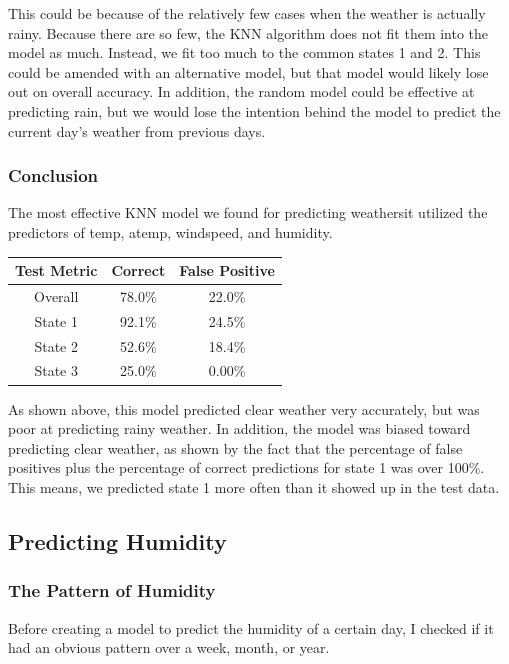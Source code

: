 \documentclass[12pt]{article}
\begin{document}
This could be because of the relatively few cases when the weather is actually rainy. Because there are so few, the KNN algorithm does not fit them into the model as much. Instead, we fit too much to the common states 1 and 2. This could be amended with an alternative model, but that model would likely lose out on overall accuracy. In addition, the random model could be effective at predicting rain, but we would lose the intention behind the model to predict the current day's weather from previous days.

\subsubsection{Conclusion}
The most effective KNN model we found for predicting weathersit utilized the predictors of temp, atemp, windspeed, and humidity.

\begin{table}[H]
\centering
 \begin{tabular}{||c | c c ||} 
 \hline
 Test Metric & Correct & False Positive \\ [0.5ex] 
 \hline\hline
 Overall   & 78.0\% & 22.0\% \\ 
 State 1   & 92.1\% & 24.5\% \\
 State 2   & 52.6\% & 18.4\% \\
 State 3   & 25.0\% & 0.00\% \\ [1ex] 
 \hline
 \end{tabular}
\end{table}

As shown above, this model predicted clear weather very accurately, but was poor at predicting rainy weather. 
In addition, the model was biased toward predicting clear weather, as shown by the fact that the percentage of false positives plus the percentage of correct predictions for state 1 was over 100\%. This means, we predicted state 1 more often than it showed up in the test data.

\newpage
\subsection{Predicting Humidity}
\subsubsection{The Pattern of Humidity}
Before creating a model to predict the humidity of a certain day, I checked if it had an obvious pattern over a week, month, or year. 
\end{document}

